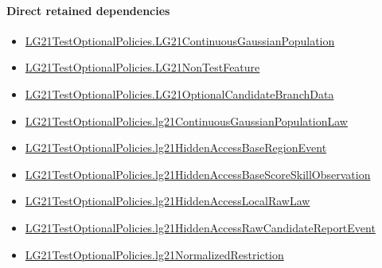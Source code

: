 \documentclass[10pt]{article}
\begin{document}
\paragraph{Direct retained dependencies}
\begin{itemize}\raggedright
\item \hyperlink{paper-prerequisite-f5e1c886d250142b}{LG21\allowbreak{}Test\allowbreak{}Optional\allowbreak{}Policies.\allowbreak{}LG21\allowbreak{}Continuous\allowbreak{}Gaussian\allowbreak{}Population}
\item \hyperlink{governing-declaration-81cb73bf3869c56d}{LG21\allowbreak{}Test\allowbreak{}Optional\allowbreak{}Policies.\allowbreak{}LG21\allowbreak{}Non\allowbreak{}Test\allowbreak{}Feature}
\item \hyperlink{governing-declaration-5ca7587508e20c80}{LG21\allowbreak{}Test\allowbreak{}Optional\allowbreak{}Policies.\allowbreak{}LG21\allowbreak{}Optional\allowbreak{}Candidate\allowbreak{}Branch\allowbreak{}Data}
\item \hyperlink{governing-declaration-8fd8cc4e09eeb58a}{LG21\allowbreak{}Test\allowbreak{}Optional\allowbreak{}Policies.\allowbreak{}lg21\allowbreak{}Continuous\allowbreak{}Gaussian\allowbreak{}Population\allowbreak{}Law}
\item \hyperlink{governing-declaration-cecb402908ae7bf6}{LG21\allowbreak{}Test\allowbreak{}Optional\allowbreak{}Policies.\allowbreak{}lg21\allowbreak{}Hidden\allowbreak{}Access\allowbreak{}Base\allowbreak{}Region\allowbreak{}Event}
\item \hyperlink{governing-declaration-52712eb1079dfba5}{LG21\allowbreak{}Test\allowbreak{}Optional\allowbreak{}Policies.\allowbreak{}lg21\allowbreak{}Hidden\allowbreak{}Access\allowbreak{}Base\allowbreak{}Score\allowbreak{}Skill\allowbreak{}Observation}
\item \hyperlink{governing-declaration-021e105247bd247f}{LG21\allowbreak{}Test\allowbreak{}Optional\allowbreak{}Policies.\allowbreak{}lg21\allowbreak{}Hidden\allowbreak{}Access\allowbreak{}Local\allowbreak{}Raw\allowbreak{}Law}
\item \hyperlink{governing-declaration-4c74d9d193ce39dc}{LG21\allowbreak{}Test\allowbreak{}Optional\allowbreak{}Policies.\allowbreak{}lg21\allowbreak{}Hidden\allowbreak{}Access\allowbreak{}Raw\allowbreak{}Candidate\allowbreak{}Report\allowbreak{}Event}
\item \hyperlink{governing-declaration-ee825e256b6d452b}{LG21\allowbreak{}Test\allowbreak{}Optional\allowbreak{}Policies.\allowbreak{}lg21\allowbreak{}Normalized\allowbreak{}Restriction}
\end{itemize}
\hypertarget{governing-declaration-1f81154f030b0dcd}{}
\end{document}
